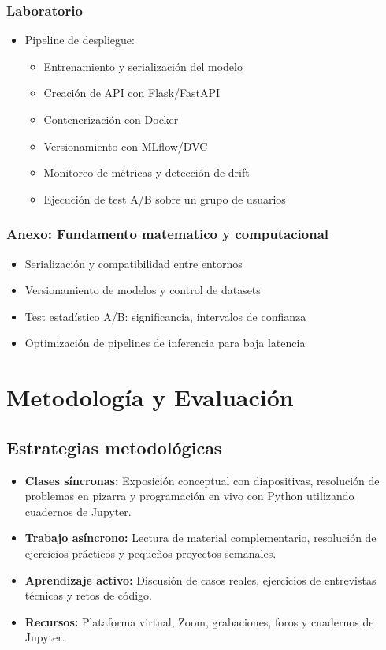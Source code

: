 \documentclass[12pt,a4paper,openany,oneside]{book}
\begin{document}
\begin{itemize}
\subsection{Laboratorio}
\begin{itemize}
    \item Pipeline de despliegue:
    \begin{itemize}
        \item Entrenamiento y serialización del modelo
        \item Creación de API con Flask/FastAPI
        \item Contenerización con Docker
        \item Versionamiento con MLflow/DVC
        \item Monitoreo de métricas y detección de drift
        \item Ejecución de test A/B sobre un grupo de usuarios
    \end{itemize}
\end{itemize}

\subsection{Anexo: Fundamento matematico y computacional}
\begin{itemize}
    \item Serialización y compatibilidad entre entornos
    \item Versionamiento de modelos y control de datasets
    \item Test estadístico A/B: significancia, intervalos de confianza
    \item Optimización de pipelines de inferencia para baja latencia
\end{itemize}

\chapter{Metodología y Evaluación}

\section{Estrategias metodológicas}
\begin{itemize}
    \item \textbf{Clases síncronas:} Exposición conceptual con diapositivas, resolución de problemas en pizarra y programación en vivo con Python utilizando cuadernos de Jupyter.
    \item \textbf{Trabajo asíncrono:} Lectura de material complementario, resolución de ejercicios prácticos y pequeños proyectos semanales.
    \item \textbf{Aprendizaje activo:} Discusión de casos reales, ejercicios de entrevistas técnicas y retos de código.
    \item \textbf{Recursos:} Plataforma virtual, Zoom, grabaciones, foros y cuadernos de Jupyter.
\end{itemize}


\end{itemize}
\end{document}
